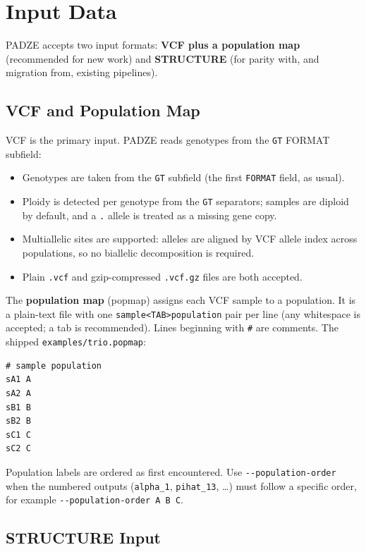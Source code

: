 \documentclass[11pt]{article}
\newcommand{\padze}{PADZE}
\begin{document}
\section{Input Data}
\label{sec:input}

\padze{} accepts two input formats: \textbf{VCF plus a population map}
(recommended for new work) and \textbf{STRUCTURE} (for parity with, and
migration from, existing pipelines).

\subsection{VCF and Population Map}
\label{sec:vcf}

VCF is the primary input. \padze{} reads genotypes from the \texttt{GT} FORMAT
subfield:
\begin{itemize}
  \item Genotypes are taken from the \texttt{GT} subfield (the first
        \texttt{FORMAT} field, as usual).
  \item Ploidy is detected per genotype from the \texttt{GT} separators; samples
        are diploid by default, and a \texttt{.} allele is treated as a missing
        gene copy.
  \item Multiallelic sites are supported: alleles are aligned by VCF allele index
        across populations, so no biallelic decomposition is required.
  \item Plain \texttt{.vcf} and gzip-compressed \texttt{.vcf.gz} files are both
        accepted.
\end{itemize}

The \textbf{population map} (popmap) assigns each VCF sample to a population. It
is a plain-text file with one \texttt{sample<TAB>population} pair per line (any
whitespace is accepted; a tab is recommended). Lines beginning with \texttt{\#}
are comments. The shipped \texttt{examples/trio.popmap}:
\begin{lstlisting}[style=out]
# sample population
sA1	A
sA2	A
sB1	B
sB2	B
sC1	C
sC2	C
\end{lstlisting}

Population labels are ordered as first encountered. Use
\texttt{-{}-population-order} when the numbered outputs (\texttt{alpha\_1},
\texttt{pihat\_13}, \ldots) must follow a specific order, for example
\texttt{-{}-population-order A B C}.

\subsection{STRUCTURE Input}
\label{sec:structure}
\end{document}
